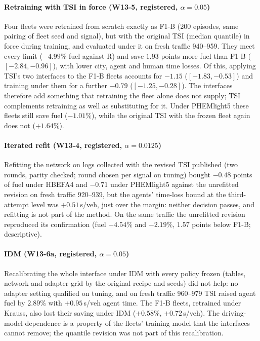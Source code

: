 \paragraph{Retraining with TSI in force (W13-5, registered, $\alpha=0.05$)} Four fleets were retrained from scratch exactly as F1-B (200
episodes, same pairing of fleet seed and signal), but with the original TSI (median quantile) in force during training, and evaluated under it
on fresh traffic 940--959. They meet every limit ($-4.99\%$ fuel against R) and save $1.93$ points more fuel than F1-B ($[-2.84,-0.96]$),
with lower city, agent and human time losses. Of this, applying TSI's two interfaces to the F1-B fleets accounts for $-1.15$
($[-1.83,-0.53]$) and training under them for a further $-0.79$ ($[-1.25,-0.28]$). The interfaces therefore add something that retraining the
fleet alone does not supply; TSI complements retraining as well as substituting for it. Under PHEMlight5 these fleets still save fuel
($-1.01\%$), while the original TSI with the frozen fleet again does not ($+1.64\%$).
\paragraph{Iterated refit (W13-4, registered, $\alpha=0.0125$)} Refitting the network on logs collected with the revised TSI published (two
rounds, parity checked; round chosen per signal on tuning) bought $-0.48$ points of fuel under HBEFA4 and $-0.71$ under PHEMlight5 against
the unrefitted revision on fresh traffic 920--939, but the agents' time-loss bound at the third-attempt level was $+0.51$\,s/veh, just over
the margin: neither decision passes, and refitting is not part of the method. On the same traffic the unrefitted revision reproduced its
confirmation (fuel $-4.54\%$ and $-2.19\%$, $1.57$ points below F1-B; descriptive).
\paragraph{IDM (W13-6a, registered, $\alpha=0.05$)} Recalibrating the whole interface under IDM with every policy frozen (tables,
network and adapter grid by the original recipe and seeds) did not help: no adapter setting qualified on tuning, and on fresh traffic
960--979 TSI raised agent fuel by $2.89\%$ with $+0.95$\,s/veh agent time. The F1-B fleets, retrained under Krauss, also lost their saving
under IDM ($+0.58\%$, $+0.72$\,s/veh). The driving-model dependence is a property of the fleets' training model that the interfaces cannot
remove; the quantile revision was not part of this recalibration.
